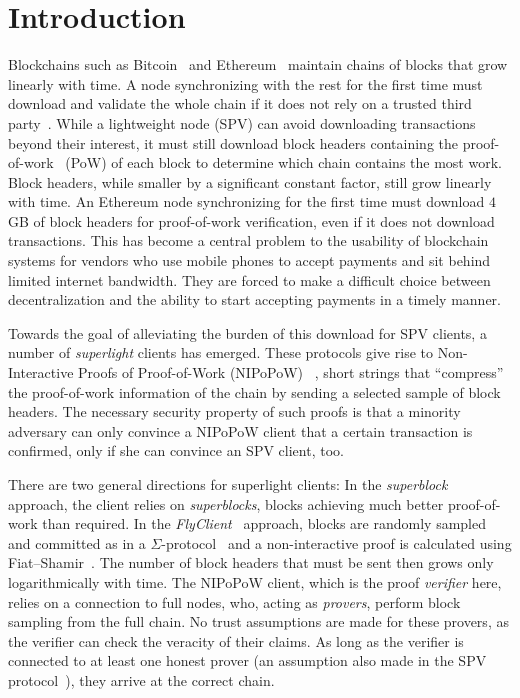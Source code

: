 \section{Introduction}
Blockchains such as Bitcoin~\cite{nakamoto} and
Ethereum~\cite{buterin,wood} maintain chains of blocks that grow linearly
with time. A node synchronizing with the rest for the first time must download and validate the whole
chain if it does not rely on a trusted third party~\cite{taxonomy}. While a lightweight
node (SPV) can avoid downloading transactions beyond their
interest, it must still download block headers containing the
proof-of-work~\cite{pow} (PoW) of each block to determine which chain contains
the most work. Block headers, while smaller by a significant constant
factor, still grow linearly with time. An Ethereum node synchronizing for the
first time must download $4$ GB of block headers for
proof-of-work verification, even if it does not download
transactions. This has become a central problem to the usability of blockchain
systems for vendors who use mobile phones to accept payments
and sit behind limited internet bandwidth. They are forced to make a difficult
choice between decentralization and the ability to start accepting payments in a
timely manner.

Towards the goal of alleviating the burden of this download for SPV clients, a
number of \emph{superlight} clients has emerged.
These protocols give rise to  Non-Interactive Proofs of Proof-of-Work (NIPoPoW)
~\cite{nipopows}, short strings
 that ``compress'' the proof-of-work information of the chain by sending a selected sample of block headers.
The necessary security property of such proofs is that a
minority adversary can only convince a
NIPoPoW client that a certain transaction is confirmed, only if she can
convince an SPV client, too.

There are two general directions for superlight clients: In the
\emph{superblock}~\cite{nipopows,compactsuperblocks} approach, the client
relies on \emph{superblocks}, blocks achieving much better
proof-of-work than required. In the
\emph{FlyClient}~\cite{flyclient} approach, blocks are randomly sampled and committed as in a $\Sigma$-protocol~\cite{schnorr} and a non-interactive
proof is calculated using Fiat--Shamir~\cite{fiatshamir}. The number of block headers
that must be sent then grows only logarithmically with time. The NIPoPoW
client, which is the proof \emph{verifier} here, relies on a connection to full nodes,
who, acting as \emph{provers},  perform block sampling from the full
chain.
No trust assumptions are made for these provers, as the
verifier can check the veracity of their claims. As long as the verifier is
connected to at least one honest prover (an assumption also made in the SPV
protocol~\cite{eclipse,eclipse-ethereum}), they arrive at the correct chain.

